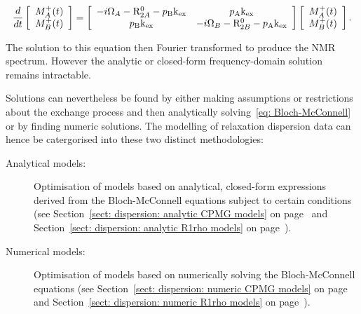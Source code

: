 \begin{equation} \label{eq: Bloch-McConnell}
    \frac{d}{dt} \left[ 
        \begin{array}{c}
            M_A^+(t) \\
            M_B^+(t)
        \end{array}
    \right] = \left[
        \begin{array}{cc}
            -i\Omega_A-\mathrm{R}_{2A}^0-p_\textrm{B}\textrm{k}_\textrm{ex} & p_\textrm{A}\textrm{k}_\textrm{ex} \\
            p_\textrm{B}\textrm{k}_\textrm{ex} & -i\Omega_B-\mathrm{R}_{2B}^0-p_\textrm{A}\textrm{k}_\textrm{ex} \\
        \end{array}
    \right] \left[
        \begin{array}{c}
            M_A^+(t) \\
            M_B^+(t)
        \end{array}
    \right] .
\end{equation}

The solution to this equation then Fourier transformed to produce the NMR spectrum.  However the analytic or closed-form frequency-domain solution remains intractable.

Solutions can nevertheless be found by either making assumptions or restrictions about the exchange process and then analytically solving~\ref{eq: Bloch-McConnell} or by finding numeric solutions.
The modelling of relaxation dispersion data can hence be catergorised into these two distinct methodologies:

\begin{description}
\item[Analytical models:]  Optimisation of models based on analytical, closed-form expressions derived from the Bloch-McConnell equations subject to certain conditions (see Section~\ref{sect: dispersion: analytic CPMG models} on page~\pageref{sect: dispersion: analytic CPMG models} and Section~\ref{sect: dispersion: analytic R1rho models} on page~\pageref{sect: dispersion: analytic R1rho models}).
\item[Numerical models:]  Optimisation of models based on numerically solving the Bloch-McConnell equations (see Section~\ref{sect: dispersion: numeric CPMG models} on page~\pageref{sect: dispersion: numeric CPMG models} and Section~\ref{sect: dispersion: numeric R1rho models} on page~\pageref{sect: dispersion: numeric R1rho models}).
\end{description}



